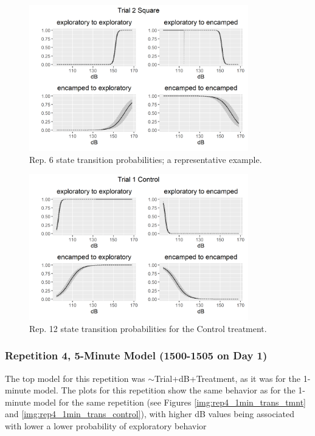 \documentclass[12pt]{article}
\begin{document}
	\begin{figure}
		\centering
		\includegraphics[width=0.85\textwidth]{trans_rep_12_trial_2_Square.png}
		\caption{Rep. 6 state transition probabilities; a representative example.}
		\label{img:rep12_1min_trans_tmnt}				
	\end{figure}
	
	\begin{figure}
		\centering
		\includegraphics[width=0.85\textwidth]{trans_rep_12_trial_1_Control.png}
		\caption{Rep. 12 state transition probabilities for the Control treatment.}
		\label{img:rep12_1min_trans_control}				
	\end{figure}
	
	\subsubsection{Repetition 4, 5-Minute Model (1500-1505 on Day 1)}
	
	The top model for this repetition was $\sim$Trial+dB+Treatment, as it was for the 1-minute model. The plots for this repetition show the same behavior as for the 1-minute model for the same repetition (see Figures \ref{img:rep4_1min_trans_tmnt} and \ref{img:rep4_1min_trans_control}), with higher dB values being associated with lower a lower probability of exploratory behavior
	
\end{document}

